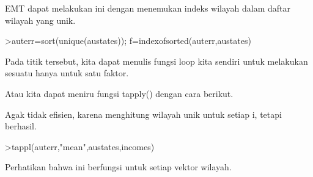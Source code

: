 \documentclass[a4paper,10pt]{article}
\begin{document}
\begin{eulernotebook}
\begin{eulercomment}
\begin{eulercomment}
\begin{eulercomment}
\begin{eulercomment}
\begin{eulercomment}
\begin{eulercomment}
\begin{eulercomment}
\begin{eulercomment}
\begin{eulercomment}
\begin{eulercomment}
\begin{eulercomment}
\begin{eulercomment}
\begin{eulercomment}
\begin{eulercomment}
\begin{eulercomment}
\begin{eulercomment}
\begin{eulercomment}
\begin{eulercomment}
\begin{eulercomment}
\begin{eulercomment}
\begin{eulercomment}
\begin{eulercomment}
\begin{eulercomment}
\begin{eulercomment}
\begin{eulercomment}
\begin{eulercomment}
\begin{eulercomment}
\begin{eulercomment}
\begin{eulercomment}
\begin{eulercomment}
\begin{eulercomment}
\begin{eulercomment}
\begin{eulercomment}
\begin{eulercomment}
\begin{eulercomment}
EMT dapat melakukan ini dengan menemukan indeks wilayah dalam daftar
wilayah yang unik.
\end{eulercomment}
\begin{eulerprompt}
>auterr=sort(unique(austates)); f=indexofsorted(auterr,austates)
\end{eulerprompt}
\begin{euleroutput}
  [6,  5,  4,  2,  2,  3,  8,  8,  4,  7,  2,  7,  4,  4,  5,  6,  5,  3,
  8,  7,  4,  2,  2,  8,  5,  1,  2,  7,  7,  1]
\end{euleroutput}
\begin{eulercomment}
Pada titik tersebut, kita dapat menulis fungsi loop kita sendiri untuk
melakukan sesuatu hanya untuk satu faktor.

Atau kita dapat meniru fungsi tapply() dengan cara berikut.
\end{eulercomment}
\begin{eulercomment}
Agak tidak efisien, karena menghitung wilayah unik untuk setiap i,
tetapi berhasil.
\end{eulercomment}
\begin{eulerprompt}
>tappl(auterr,"mean",austates,incomes)
\end{eulerprompt}
\begin{euleroutput}
  [44.5,  57.3333333333,  55.5,  53.6,  55,  60.5,  56,  52.25]
\end{euleroutput}
\begin{eulercomment}
Perhatikan bahwa ini berfungsi untuk setiap vektor wilayah.

\end{eulercomment}
\end{eulercomment}
\end{eulercomment}
\end{eulercomment}
\end{eulercomment}
\end{eulercomment}
\end{eulercomment}
\end{eulercomment}
\end{eulercomment}
\end{eulercomment}
\end{eulercomment}
\end{eulercomment}
\end{eulercomment}
\end{eulercomment}
\end{eulercomment}
\end{eulercomment}
\end{eulercomment}
\end{eulercomment}
\end{eulercomment}
\end{eulercomment}
\end{eulercomment}
\end{eulercomment}
\end{eulercomment}
\end{eulercomment}
\end{eulercomment}
\end{eulercomment}
\end{eulercomment}
\end{eulercomment}
\end{eulercomment}
\end{eulercomment}
\end{eulercomment}
\end{eulercomment}
\end{eulercomment}
\end{eulercomment}
\end{eulercomment}
\end{eulernotebook}
\end{document}
